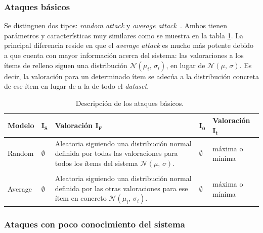 \subsubsection{Ataques básicos}

Se distinguen dos tipos: \textit{random attack} y \textit{average attack}~\cite{mingdan2018ShillingAttacksAReview}. Ambos tienen parámetros y características muy similares como se muestra en la tabla \ref{tabla_descripcion_ataques_basicos}. La principal diferencia reside en que el \textit{average attack} es mucho más potente debido a que cuenta con mayor información acerca del sistema: las valoraciones a los ítems de relleno siguen una distribución $\mathcal{N}(\mu_i,\,\sigma_i)$, en lugar de $\mathcal{N}(\mu,\,\sigma)$. Es decir, la valoración para un determinado ítem se adecúa a la distribución concreta de ese ítem en lugar de a la de todo el \textit{dataset}.


\begin{table}
\small
\begin{centering}

		\begin{tabular}{@{}p{5em} p{2em} p{16em} p{2em} p{5em}@{}}
		\toprule
		\textbf{Modelo} & $\mathbf{I_S}$ & \textbf{Valoración} $\mathbf{I_F}$ & $\mathbf{I_0}$ & \textbf{Valoración} $\mathbf{I_t}$\\ 
		\midrule
	
		Random & $\emptyset$ & Aleatoria siguiendo una distribución normal definida por todas las valoraciones para todos los ítems del sistema $\mathcal{N}(\mu,\,\sigma)$. & $\emptyset$ & máxima o mínima \\\\
		
		Average & $\emptyset$ & Aleatoria siguiendo una distribución normal definida por las otras valoraciones para ese ítem en concreto $\mathcal{N}(\mu_i,\,\sigma_i)$. & $\emptyset$ & máxima o mínima\\
		\bottomrule
		\end{tabular}
	
\end{centering}
\caption{Descripción de los ataques básicos.~\cite{zhou2021SemisupervisedRecommendationAttack}}
\label{tabla_descripcion_ataques_basicos}	
\end{table}


\subsubsection{Ataques con poco conocimiento del sistema}

